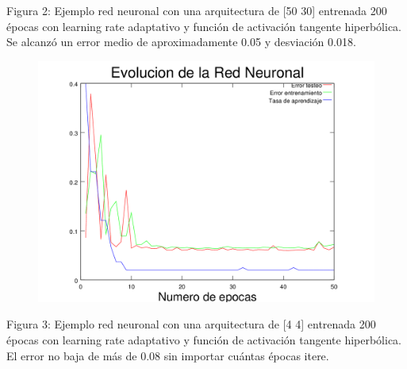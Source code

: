 \documentclass[%
    final,
    reprint,
    notitlepage,
    narroweqnarray,
    inline,
    twoside,
    invited
    ]{ieee}
\begin{document}
\begin{center}
\par Figura 2: Ejemplo red neuronal con una arquitectura de [50 30] entrenada 200 épocas con learning rate adaptativo y función de activación tangente hiperbólica. 
Se alcanzó un error medio de aproximadamente 0.05 y desviación 0.018.
\end{center}
\clearpage

\begin{figure}[H]
\begin{center}
\includegraphics[scale=0.70]{./images/9.png}
\label{modelado}
\end{center}
\end{figure}

\begin{center}
\par Figura 3: Ejemplo red neuronal con una arquitectura de [4 4] entrenada 200 épocas con learning rate adaptativo y función de activación tangente hiperbólica. 
El error no baja de más de 0.08 sin importar cuántas épocas itere.
\end{center}




\end{document}
